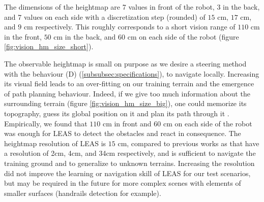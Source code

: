 The dimensions of the heightmap are 7 values in front of the robot, 3 in the back, and 7 values on each side with a discretization step (rounded) of $15$ cm, $17$ cm, and $9$ cm respectively. This roughly corresponds to a short vision range of $110$ cm in the front, $50$ cm in the back, and $60$ cm on each side of the robot (figure \ref{fig:vision_hm_size_short}).

The observable heightmap is small on purpose as we desire a steering method with the behaviour (D) (\ref{subsubsec:specifications}), to navigate locally. Increasing its visual field leads to an over-fitting on our training terrain and the emergence of path planning behaviour.
Indeed, if we give too much information about the surrounding terrain (figure \ref{fig:vision_hm_size_big}), one could memorize its topography, guess its global position on it and plan its path through it \cite{rl_navigation_video_game_2020}.
Empirically, we found that $110$ cm in front and $60$ cm on each side of the robot was enough for LEAS to detect the obstacles and react in consequence.
The heightmap resolution of LEAS is $15$ cm, compared to previous works as \cite{RLOC, deepGait, deepLoco} that have a resolution of 2cm, 4cm, and 34cm respectively, and is sufficient to navigate the training ground and to generalize to unknown terrains. 
Increasing the resolution did not improve the learning or navigation skill of LEAS for our test scenarios, but may be required in the future for more complex scenes with elements of smaller surfaces (handrails detection for example).

